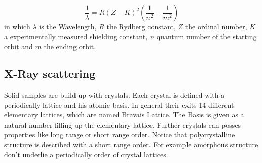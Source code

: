 	\begin{equation}
		\frac{1}{\lambda}=R(Z-K)^2 \left ( \frac{1}{n^2} - \frac{1}{m^2} \right )
	\end{equation}
	in which $\lambda$ is the Wavelength, $R$ the Rydberg constant, $Z$ the ordinal number, $K$ a experimentally measured shielding constant, $n$ quantum number of the starting orbit and $m$ the ending orbit.
	
	\subsection{X-Ray scattering}
	Solid samples are build up with crystals. Each crystal is defined with a periodically lattice and his atomic basis. In general their exits 14 different elementary lattices, which are named Bravais Lattice. The Basis is given as a natural number filling up the elementary lattice. Further crystals can posses properties like long range or short range order. Notice that polycrystalline structure is described with a short range order. For example amorphous structure don't underlie a periodically order of crystal lattices.
	
